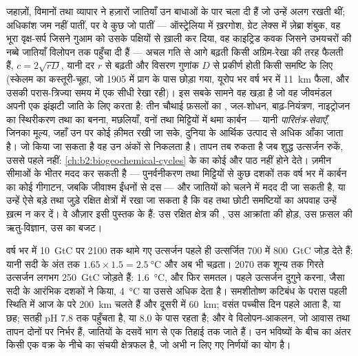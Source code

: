 \begin{proposition}\label{prop:b2:global-change:invasion}
जहाज़ों, विमानों तथा व्यापार ने हज़ारों जातियाँ उन
बाधाओं के पार चला दी हैं जो उन्हें अलग रखती थीं; अधिकांश जम नहीं पातीं, पर वे
कुछ जो पातीं --- ऑस्ट्रेलिया में ख़रगोश, ग्रेट लेक्स में ज़ेब्रा शंबुक,
वह भूरा वृक्ष-सर्प जिसने गुआम को उसके पक्षियों से ख़ाली कर दिया,
वह काइट्रिड कवक जिसने उभयचरों की नब्बे जातियाँ विलोपन तक पहुँचा दी हैं ---
अचल गति से आगे बढ़ती किसी अग्रिम-रेखा की तरह फैलती हैं, $c =
2\sqrt{rD}$, यानी दर $r$ से बढ़ती और विसरण गुणांक $D$ से
प्रकीर्ण होती किसी समष्टि के लिए (स्केलम का कस्तूरी-चूहा, जो 1905 में
प्राग के पास छोड़ा गया, यूरोप भर वर्ष भर में \qty{11}{km} फैला,
और उसकी परास-त्रिज्या समय में एक सीधी रेखा रही)। इस सबके सामने वह खड़ा है
जो वह जीवमंडल अपनी एक झंझटी जाति के लिए करता है:
तीन चौथाई फ़सलों का , जल-शोधन,
बाढ़-नियंत्रण, नाइट्रोजन का स्थिरीकरण तथा  का बनना, मछलियाँ,
वनों तथा मिट्टियों में थमा कार्बन --- यानी \emph{पारितंत्र-सेवाएँ},
जिनका मूल्य, जहाँ उन पर कोई क़ीमत रखी जा सके, दुनिया के
आर्थिक उत्पाद से अधिक आँका जाता है। जो किया जा सकता है वह उन अंकों से निकलता है।
तापन तब रुकता है जब शुद्ध उत्सर्जन रुकें, उससे पहले नहीं:
\cref{ch:b2:biogeochemical-cycles} के 
\emph{} का कोई और पाठ नहीं होने देते। ज़मीन सीमाओं के भीतर मदद कर सकती है ---
पुनर्वनीकरण तथा मिट्टियों से कुछ दशकों तक वर्ष भर में कार्बन का कोई
गीगाटन, जबकि जीवाश्म ईंधनों से दस --- और जातियों को चलने में
मदद दी जा सकती है, या उन्हें ऐसे बड़े तथा जुड़े रक्षित क्षेत्रों में रखा जा सकता है
कि वह  तथा छोटी समष्टियों का अपवाह
उन्हें ख़त्म न कर दें। वे औज़ार इसी पुस्तक के हैं: उस रक्षित क्षेत्र की
, उस आक्रांता की होड़, उस फ़सल की
ऋतु-विज्ञान, उस  का बजट।
\end{proposition}

\begin{example}[तीन भविष्य]\label{ex:b2:global-change:scenarios}
वर्ष भर में \qty{10}{GtC} पर 2100 तक थामे गए उत्सर्जन पहले ही उत्सर्जित
\qty{700}{} में \qty{800}{GtC} जोड़ देते हैं: यानी सदी के अंत तक $1.65\times 1.5 =
\qty{2.5}{\celsius}$ और अब भी चढ़ता। 2070 तक शून्य तक गिरते उत्सर्जन
लगभग \qty{250}{GtC} जोड़ते हैं: \qty{1.6}{\celsius},
और फिर समतल। पहले उत्सर्जन दुगुने करना, जैसा सदी के आरंभिक
दशकों ने किया, \qty{4}{\celsius} या उससे अधिक देता है। समशीतोष्ण
कटिबंध के परास पहली स्थिति में आज के परे \qty{200}{km} चलते हैं
और दूसरी में \qty{60}{km}; वसंत पच्चीस
दिन पहले आता है, या छह; सतही pH $7.8$ तक पहुँचता है, या
$8.0$ के पास रहता है; और वे विलोपन-आकलन, जो आवास तथा
तापन दोनों पर निर्भर हैं, जातियों के दसवें भाग से एक तिहाई तक जाते हैं।
उन भविष्यों के बीच का अंतर किसी एक वक्र के नीचे का संचयी क्षेत्रफल है,
जो अभी न लिए गए निर्णयों का योग है।
\end{example}

